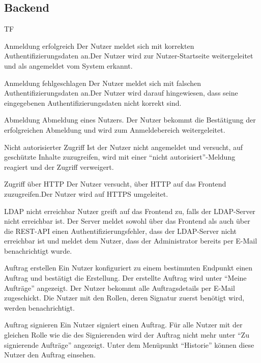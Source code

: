 \subsection{Backend}
\begin{Kriterien}{TF}

    \item[Anmeldung erfolgreich] Der Nutzer meldet sich mit korrekten Authentifizierungsdaten an.\ergebnis Der Nutzer wird zur Nutzer-Startseite weitergeleitet und als angemeldet vom \gls{System} erkannt.

    \item[Anmeldung fehlgeschlagen] Der Nutzer meldet sich mit falschen Authentifizierungsdaten an.\ergebnis Der Nutzer wird darauf hingewiesen, dass seine eingegebenen Authentifizierungsdaten nicht korrekt sind.

    \item[Abmeldung] Abmeldung eines Nutzers. \ergebnis Der Nutzer bekommt die Bestätigung der erfolgreichen Abmeldung und wird zum Anmeldebereich weitergeleitet.

    \item[Nicht autorisierter Zugriff] Ist der Nutzer nicht angemeldet und versucht, auf geschützte Inhalte zuzugreifen, wird mit einer \enquote{nicht autorisiert}-Meldung reagiert und der Zugriff verweigert.

    \item[Zugriff über HTTP] Der Nutzer versucht, über HTTP auf das Frontend zuzugreifen.\ergebnis Der Nutzer wird auf HTTPS umgeleitet.

    \item[\gls{LDAP} nicht erreichbar] Nutzer greift auf das Frontend zu, falls der LDAP-\gls{Server} nicht erreichbar ist. \ergebnis Der Server meldet sowohl über das Frontend als auch über die \gls{REST-API} einen Authentifizierungsfehler, dass der LDAP-Server nicht erreichbar ist und meldet dem Nutzer, dass der Administrator bereits per E-Mail benachrichtigt wurde.

     \item[Auftrag erstellen] Ein Nutzer konfiguriert zu einem bestimmten Endpunkt einen Auftrag und bestätigt die Erstellung. \ergebnis Der erstellte Auftrag wird unter \enquote{Meine Aufträge} angezeigt. Der Nutzer bekommt alle Auftragsdetails per E-Mail zugeschickt. Die Nutzer mit den Rollen, deren Signatur zuerst benötigt wird, werden benachrichtigt.

      \item[Auftrag signieren] Ein Nutzer signiert einen Auftrag. \ergebnis Für alle Nutzer mit der gleichen Rolle wie die des Signierenden wird der Auftrag nicht mehr unter \enquote{Zu signierende Aufträge} angezeigt. Unter dem Menüpunkt \enquote{Historie} können diese Nutzer den Auftrag einsehen.


\end{Kriterien}
